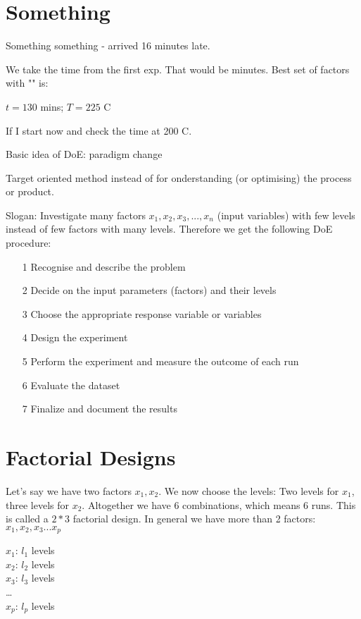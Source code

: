 \section{Something}

Something something - arrived 16 minutes late.

We take the time from the first exp. That would be minutes. Best set of factors with "\ofat" is:

$t = 130$ mins; $T = 225$ \degree C

If I start now and check the time at 200 \degree C.

Basic idea of DoE: paradigm change

Target oriented method instead of \ofat for onderstanding (or optimising) the process or product.

Slogan: Investigate many factors $x_1, x_2, x_3, ... , x_n$ (input variables) with few levels instead of few factors with many levels. Therefore we get the following DoE procedure:

\begin{itemize}
	\item[1] Recognise and describe the problem
	\item[2] Decide on the input parameters (factors) and their levels
	\item[3] Choose the appropriate response variable or variables
	\item[4] Design the experiment
	\item[5] Perform the experiment and measure the outcome of each run
	\item[6] Evaluate the dataset
	\item[7] Finalize and document the results
\end{itemize}

\section{Factorial Designs}

Let's say we have two factors $x_1, x_2$. We now choose the levels: Two levels for $x_1$, three levels for $x_2$. Altogether we have 6 combinations, which means 6 runs. This is called a $2*3$ factorial design. In general we have more than 2 factors: $x_1, x_2, x_3 ... x_p$

\begin{center}

	$x_1$: $l_1$ levels\\
	$x_2$: $l_2$ levels\\
	$x_3$: $l_3$ levels\\
	\dots \\
	$x_p$: $l_p$ levels\\

\end{center}

